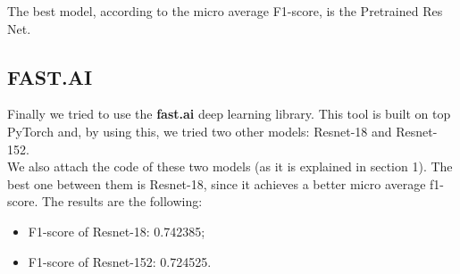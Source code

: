 The best model, according to the micro average F1-score, is the Pretrained Res Net.

\subsection{FAST.AI}

Finally we tried to use the \textbf{fast.ai} deep learning library. This tool is built on top PyTorch and, by using this, we tried two other models: Resnet-18 and Resnet-152. \\
We also attach the code of these two models (as it is explained in section 1). The best one between them is Resnet-18, since it achieves a better micro average f1-score. 
The results are the following:

\begin{itemize}
	\item F1-score of Resnet-18: 0.742385;
	\item F1-score of Resnet-152: 0.724525.
\end{itemize}

